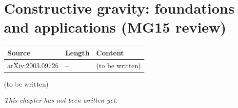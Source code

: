 \chapter{Constructive gravity: foundations and applications (MG15 review)}\label{ch:c31}
\begin{paracol}{2}

\begin{sources}
\begin{tabularx}{\linewidth}{@{}l l L@{}}
\toprule
\textbf{Source} & \textbf{Length} & \textbf{Content}\\
\midrule
arXiv:2003.09726 & -- & (to be written)\\
\bottomrule
\end{tabularx}

\end{sources}

\begin{reading}
(to be written)
\end{reading}

\emph{This chapter has not been written yet.}

\flushside
\end{paracol}
